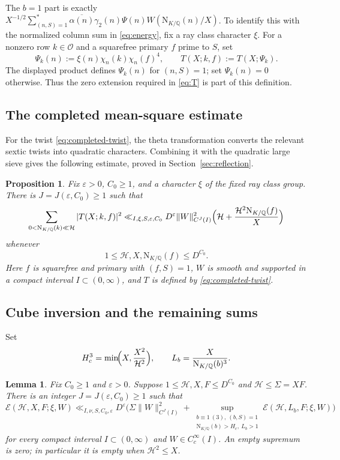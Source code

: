 \documentclass[11pt,a4paper]{article}
\numberwithin{equation}{section}
\numberwithin{figure}{section}
\newtheorem{proposition}[theorem]{Proposition}
\newtheorem{lemma}[theorem]{Lemma}
\theoremstyle{definition}
\theoremstyle{remark}
\newcommand{\Q}{\mathbb Q}
\newcommand{\NK}{\mathrm N_{K/\Q}}
\newcommand{\OO}{\mathcal O}
\newcommand{\E}{\mathcal E}
\begin{document}
The $b=1$ part is exactly
$X^{-1/2}\sum_{(n,S)=1}^*\overline{\alpha(n)}\gamma_2(n)\Psi(n)W(\NK(n)/X)$.
To identify this with the normalized column sum in \eqref{eq:energy},
fix a ray class character $\xi$. For a nonzero row $k\in\OO$ and a
squarefree primary $f$ prime to $S$, set
\begin{equation}\label{eq:completed-twist}
 \Psi_k(n):=\xi(n)\chi_n(k)\chi_n(f)^4,
 \qquad T(X;k,f):=T(X;\Psi_k).
\end{equation}
The displayed product defines $\Psi_k(n)$ for $(n,S)=1$; set $\Psi_k(n)=0$ otherwise. Thus the zero extension required in \eqref{eq:T} is part of this definition.


\subsection{The completed mean-square estimate}
For the twist \eqref{eq:completed-twist}, the theta transformation converts
the relevant sextic twists into quadratic characters. Combining it with
the quadratic large sieve gives the following estimate, proved in
Section~\ref{sec:reflection}.

\begin{proposition}\label{prop:R}
Fix $\varepsilon>0$, $C_0\ge1$, and a character $\xi$ of the fixed ray
class group. There is $J=J(\varepsilon,C_0)\ge1$ such that
\begin{equation}\label{eq:R}
 \sum_{0<\NK(k)\ll\mathcal H}|T(X;k,f)|^2
 \ll_{I,\xi,S,\varepsilon,C_0}
 D^\varepsilon\|W\|_{C^J(I)}^2
 \Bigl(\mathcal H+\frac{\mathcal H^2\NK(f)}{X}\Bigr)
\end{equation}
whenever
\[
 1\le\mathcal H,X,\NK(f)\le D^{C_0}.
\]
Here $f$ is squarefree and primary with $(f,S)=1$,
$W$ is smooth and supported in a compact interval $I\subset(0,\infty)$,
and $T$ is defined by \eqref{eq:completed-twist}.
\end{proposition}
\subsection{Cube inversion and the remaining sums}
Set
\begin{equation}\label{eq:cube-cutoff}
 H_c^3=\min\!\Bigl(X,\frac{X^2}{\mathcal H^2}\Bigr),
 \qquad L_b=\frac{X}{\NK(b)^3}.
\end{equation}

\begin{lemma}\label{lem:cube-reduction}
Fix $C_0\ge1$ and $\varepsilon>0$. Suppose
$1\le\mathcal H,X,F\le D^{C_0}$ and $\mathcal H\le\Sigma=XF$.
There is an integer $J=J(\varepsilon,C_0)\ge1$ such that
\begin{equation}\label{eq:cube-reduction}
 \E(\mathcal H,X,F;\xi,W)
 \ll_{I,\nu,S,C_0,\varepsilon}D^\varepsilon
 \biggl(\Sigma\|W\|_{C^J(I)}^2+
 \sup_{\substack{b\equiv1\ (3),\ (b,S)=1\\
                  \NK(b)>H_c,\ L_b>1}}
       \E(\mathcal H,L_b,F;\xi,W)\biggr)
\end{equation}
for every compact interval $I\subset(0,\infty)$ and
$W\in C_c^\infty(I)$. An empty supremum is zero; in particular it
is empty when $\mathcal H^2\le X$.
\end{lemma}
\end{document}
